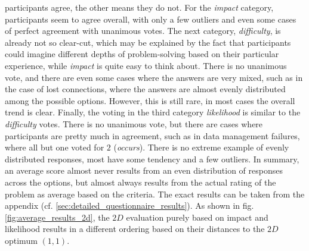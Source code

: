 \documentclass[english, master, utf8]{base/thesis_KBS}
\begin{document}
participants agree, the other means they do not. For the \textit{impact} category, participants seem to agree overall, with only a few outliers and even some cases of perfect
agreement with unanimous votes. The next category, \textit{difficulty}, is already not so clear-cut, which may be explained by the fact that participants could imagine different
depths of problem-solving based on their particular experience, while \textit{impact} is quite easy to think about. There is no unanimous vote, and there are even some cases where
the answers are very mixed, such as in the case of lost connections, where the answers are almost evenly distributed among the possible options. However, this is still rare, in most
cases the overall trend is clear. Finally, the voting in the third category \textit{likelihood} is similar to the \textit{difficulty} votes. There is no unanimous vote, but there
are cases where participants are pretty much in agreement, such as in data management failures, where all but one voted for $2$ (\textit{occurs}). There is no extreme example of
evenly distributed responses, most have some tendency and a few outliers. In summary, an average score almost never results from an even distribution of responses across the options,
but almost always results from the actual rating of the problem as average based on the criteria. The exact results can be taken from the appendix 
(cf. \ref{sec:detailed_questionnaire_results}).\newline
As shown in fig. \ref{fig:average_results_2d}, the $2D$ evaluation purely based on impact and likelihood results in a different ordering based on their distances 
to the $2D$ optimum $(1, 1)$.
\end{document}
